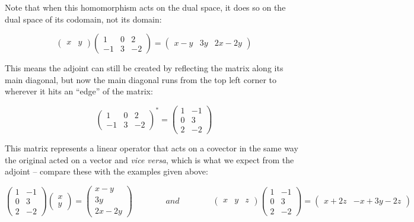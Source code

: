 \documentclass[oneside,english]{amsbook}
\numberwithin{section}{chapter}
\theoremstyle{plain}
\theoremstyle{definition}
\begin{document}
Note that when this homomorphism acts on the dual space, it does so on
the dual space of its codomain, not its domain:

\[\begin{pmatrix}
	x & y
\end{pmatrix}\begin{pmatrix}
	1 & 0 & 2 \\
	- 1 & 3 & - 2
\end{pmatrix} = \begin{pmatrix}
	x - y & 3y & 2x - 2y
\end{pmatrix}\]

This means the adjoint can still be created by reflecting the matrix
along its main diagonal, but now the main diagonal runs from the top
left corner to wherever it hits an ``edge'' of the matrix:

\[\begin{pmatrix}
	1 & 0 & 2 \\
	- 1 & 3 & - 2
\end{pmatrix}^{*} = \begin{pmatrix}
	1 & - 1 \\
	0 & 3 \\
	2 & - 2
\end{pmatrix}\]

This matrix represents a linear operator that acts on a covector in the
same way the original acted on a vector and \emph{vice versa}, which is
what we expect from the adjoint -- compare these with the examples given
above:

\[\begin{pmatrix}
	1 & - 1 \\
	0 & 3 \\
	2 & - 2
\end{pmatrix}\begin{pmatrix}
	x \\
	y
\end{pmatrix} = \begin{pmatrix}
	x - y \\
	3y \\
	2x - 2y
\end{pmatrix}\ \ \ \ \ \ \ \ \ \ \ \ \ \ \ \ \ \ and\ \ \ \ \ \ \ \ \ \ \ \ \ \ \ \ \ \ \begin{pmatrix}
	x & y & z
\end{pmatrix}\begin{pmatrix}
	1 & - 1 \\
	0 & 3 \\
	2 & - 2
\end{pmatrix} = \begin{pmatrix}
	x + 2z & - x + 3y - 2z
\end{pmatrix}\]
\end{document}
